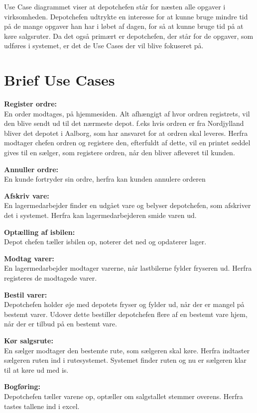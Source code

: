 Use Case diagrammet viser at depotchefen står for næsten alle opgaver i virksomheden. Depotchefen udtrykte en interesse for at kunne bruge mindre tid på de mange opgaver han har i løbet af dagen, for så at kunne bruge tid på at køre salgsruter. Da det også primært er depotchefen, der står for de opgaver, som udføres i systemet, er det de Use Cases der vil blive fokuseret på.

\section{Brief Use Cases}\label{brief}
\textbf{Register ordre:} \\
En order modtages, på hjemmesiden. Alt afhængigt af hvor ordren registrets, vil den blive sendt ud til det nærmeste depot. f.eks hvis ordren er fra Nordjylland bliver det depotet i Aalborg, som har ansvaret for at ordren skal leveres. Herfra modtager chefen ordren og registere den, efterfuldt af dette, vil en printet seddel gives til en sælger, som registere ordren, når den bliver afleveret til kunden. 

\textbf{Annuller ordre:} \\
En kunde fortryder sin ordre, herfra kan kunden annulere orderen

\textbf{Afskriv vare:} \\
En lagermedarbejder finder en udgået vare og belyser depotchefen, som afskriver det i systemet. Herfra kan lagermedarbejderen smide varen ud. 

\textbf{Optælling af isbilen:} \\
Depot chefen tæller isbilen op, noterer det ned og opdaterer lager. 

\textbf{Modtag varer:} \\
En lagermedarbejder modtager varerne, når lastbilerne fylder fryseren ud. Herfra registeres de modtagede varer. 

\textbf{Bestil varer:} \\
Depotchefen holder øje med depotets fryser og fylder ud, når der er mangel på bestemt varer. Udover dette bestiller depotchefen flere af en bestemt vare hjem, når der er tilbud på en bestemt vare. 

\textbf{Kør salgsrute:} \\
En sælger modtager den bestemte rute, som sælgeren skal køre. Herfra indtaster sælgeren ruten ind i rutesystemet. Systemet finder ruten og nu er sælgeren klar til at køre ud med is. 

\textbf{Bogføring:} \\
Depotchefen tæller varene op, optæller om salgstallet stemmer overens. Herfra tastes tallene ind i excel. 

